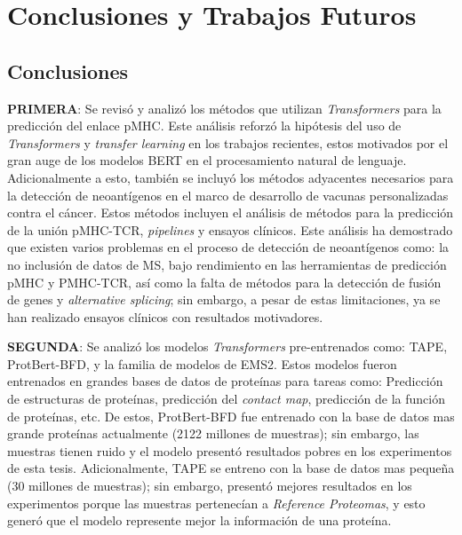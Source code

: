 \chapter{Conclusiones y Trabajos Futuros}
\label{cap:conclusiones}


\section{Conclusiones}

\textbf{PRIMERA}: Se revisó y analizó los métodos que utilizan \textit{Transformers} para la predicción del enlace pMHC. Este análisis reforzó la hipótesis del uso de \textit{Transformers} y \textit{transfer learning} en los trabajos  recientes, estos motivados por el gran auge de los modelos BERT en el procesamiento natural de lenguaje. Adicionalmente a esto, también se incluyó los métodos adyacentes necesarios para la detección de neoantígenos en el marco de desarrollo de vacunas personalizadas contra el cáncer. Estos métodos incluyen el análisis de métodos para la predicción de la unión pMHC-TCR, \textit{pipelines} y ensayos clínicos. Este análisis ha demostrado que existen varios problemas en el proceso de detección de neoantígenos como: la no inclusión de datos de MS, bajo rendimiento en las herramientas de predicción pMHC y PMHC-TCR, así como la falta de métodos para la detección de fusión de genes y \textit{alternative splicing}; sin embargo, a pesar de estas limitaciones, ya se han realizado ensayos clínicos con resultados motivadores.

\textbf{SEGUNDA}: Se analizó los modelos \textit{Transformers} pre-entrenados como: TAPE, ProtBert-BFD, y la familia de modelos de EMS2. Estos modelos fueron entrenados en grandes bases de datos de proteínas para tareas como: Predicción de estructuras de proteínas, predicción del \textit{contact map}, predicción de la función de proteínas, etc. De estos, ProtBert-BFD fue entrenado con la base de datos mas grande proteínas actualmente (2122 millones de muestras); sin embargo, las muestras tienen ruido y  el modelo presentó resultados pobres en los experimentos de esta tesis. Adicionalmente, TAPE se entreno con la base de datos mas pequeña (30 millones de muestras); sin embargo, presentó mejores resultados en los experimentos porque las muestras pertenecían a \textit{Reference Proteomas}, y esto generó que el modelo represente mejor la información de una proteína.

